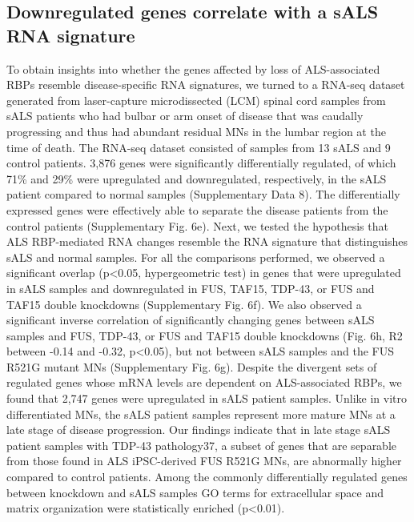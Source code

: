 \subsection{Downregulated genes correlate with a sALS RNA signature}
To obtain insights into whether the genes affected by loss of ALS-associated RBPs resemble disease-specific RNA signatures, we turned to a RNA-seq dataset generated from laser-capture microdissected (LCM) spinal cord samples from sALS patients who had bulbar or arm onset of disease that was caudally progressing and thus had abundant residual MNs in the lumbar region at the time of death\cite{Batra2016}. The RNA-seq dataset consisted of samples from 13 sALS and 9 control patients. 3,876 genes were significantly differentially regulated, of which 71\% and 29\% were upregulated and downregulated, respectively, in the sALS patient compared to normal samples (Supplementary Data 8). The differentially expressed genes were effectively able to separate the disease patients from the control patients (Supplementary Fig. 6e). Next, we tested the hypothesis that ALS RBP-mediated RNA changes resemble the RNA signature that distinguishes sALS and normal samples. For all the comparisons performed, we observed a significant overlap (p<0.05, hypergeometric test) in genes that were upregulated in sALS samples and downregulated in FUS, TAF15, TDP-43, or FUS and TAF15 double knockdowns (Supplementary Fig. 6f). We also observed a significant inverse correlation of significantly changing genes between sALS samples and FUS, TDP-43, or FUS and TAF15 double knockdowns (Fig. 6h, R2 between -0.14 and -0.32, p<0.05), but not between sALS samples and the FUS R521G mutant MNs (Supplementary Fig. 6g). Despite the divergent sets of regulated genes whose mRNA levels are dependent on ALS-associated RBPs, we found that 2,747 genes were upregulated in sALS patient samples. Unlike in vitro differentiated MNs, the sALS patient samples represent more mature MNs at a late stage of disease progression. Our findings indicate that in late stage sALS patient samples with TDP-43 pathology37, a subset of genes that are separable from those found in ALS iPSC-derived FUS R521G MNs, are abnormally higher compared to control patients. Among the commonly differentially regulated genes between knockdown and sALS samples GO terms for extracellular space and matrix organization were statistically enriched (p<0.01).

